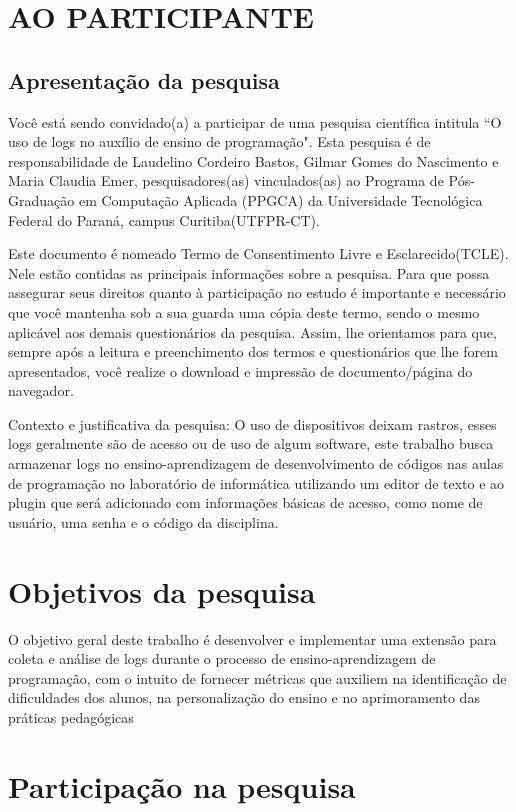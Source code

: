 \documentclass[12pt,a4paper]{article}
\begin{document}
\section{AO PARTICIPANTE}
\subsection{Apresentação da pesquisa}

\noindent Você está sendo convidado(a) a participar de uma pesquisa científica intitula ``O uso de logs no auxílio de ensino de programação". Esta pesquisa é de responsabilidade de Laudelino Cordeiro Bastos, Gilmar Gomes do Nascimento e Maria Claudia Emer, pesquisadores(as) vinculados(as) ao Programa de Pós-Graduação em Computação Aplicada (PPGCA) da Universidade Tecnológica Federal do Paraná, campus Curitiba(UTFPR-CT).

Este documento é nomeado Termo de Consentimento Livre e Esclarecido(TCLE). Nele estão contidas as principais informações sobre a pesquisa. Para que possa assegurar seus direitos quanto à participação no estudo é importante e necessário que você mantenha sob a sua guarda uma cópia deste termo, sendo o mesmo aplicável aos demais questionários da pesquisa. Assim, lhe orientamos para que, sempre após a leitura e preenchimento dos termos e questionários que lhe forem apresentados, você realize o download e impressão de documento/página do navegador. 

Contexto e justificativa da pesquisa: O uso de dispositivos deixam rastros, esses logs geralmente são de acesso ou de uso de algum software, este trabalho busca armazenar logs no ensino-aprendizagem de desenvolvimento de códigos nas aulas de programação no laboratório de informática utilizando um editor de texto e ao plugin que será adicionado com informações básicas de acesso, como nome de usuário, uma senha e o código da disciplina. 

\section{Objetivos da pesquisa}

O objetivo geral deste trabalho é desenvolver e implementar uma extensão para coleta e análise de logs durante o processo de ensino-aprendizagem de programação, com o intuito de fornecer métricas que auxiliem na identificação de dificuldades dos alunos, na personalização do ensino e no aprimoramento das práticas pedagógicas

\section{Participação na pesquisa}
\end{document}
